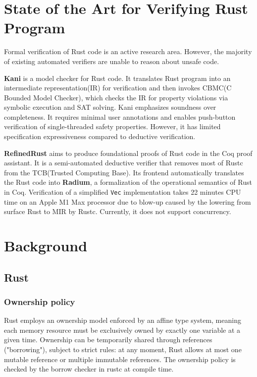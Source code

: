 \documentclass[conference]{IEEEtran}
\begin{document}
\section{State of the Art for Verifying Rust Program}
Formal verification of Rust code is an active research area. However, the majority of existing automated verifiers\cite{Prusti,Creusot} are unable to reason about unsafe code. 

\textbf{Kani}\cite{kani} is a model checker for Rust code. It translates Rust program into an intermediate representation(IR) for verification and then invokes CBMC(C Bounded Model Checker)\cite{kroening2023cbmccboundedmodel}, which checks the IR for property violations via symbolic execution and SAT solving. Kani emphasizes soundness over completeness. It requires minimal user annotations and enables push-button verification of single-threaded safety properties. However, it has limited specification expressiveness compared to deductive verification.   

\textbf{RefinedRust}\cite{RefinedRust} aims to produce foundational proofs of Rust code in the Coq proof assistant. It is a semi-automated deductive verifier that removes most of Rustc from the TCB(Trusted Computing Base). Its frontend automatically translates the Rust code into \textbf{Radium}, a formalization of the operational semantics of Rust in Coq. Verification of a simplified \texttt{Vec} implementation takes 22 minutes CPU time on an Apple M1 Max processor due to blow-up caused by the lowering from surface Rust to MIR by Rustc. Currently, it does not support concurrency.    




\section{Background}

\subsection{Rust}
\subsubsection{Ownership policy}
Rust employs an ownership model enforced by an affine type system, meaning each memory resource must be exclusively owned by exactly one variable at a given time. Ownership can be temporarily shared through references ("borrowing"), subject to strict rules: at any moment, Rust allows at most one mutable reference or multiple immutable references. The ownership policy is checked by the borrow checker in rustc at compile time.
\end{document}
